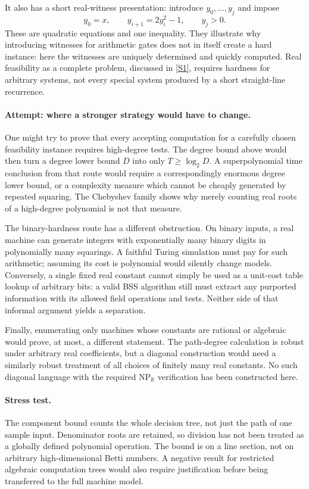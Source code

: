 \documentclass[11pt,a4paper]{article}
\newcommand{\R}{\mathbb{R}}
\newcommand{\sref}[2]{\hyperlink{source:#1:#2}{[S#2]}}
\numberwithin{equation}{section}
\begin{document}
It also has a short real-witness presentation: introduce $y_0,\ldots,y_j$
and impose
\[
 y_0=x,\qquad y_{i+1}=2y_i^2-1,\qquad y_j>0.
\]
These are quadratic equations and one inequality. They illustrate why
introducing witnesses for arithmetic gates does not in itself create a
hard instance: here the witnesses are uniquely determined and quickly
computed. Real feasibility as a complete problem, discussed in
\sref{30006767}{1}, requires hardness for arbitrary systems, not every special
system produced by a short straight-line recurrence.

\paragraph{Attempt: where a stronger strategy would have to change.}
One might try to prove that every accepting computation for a carefully
chosen feasibility instance requires high-degree tests. The degree bound
above would then turn a degree lower bound $D$ into only $T\ge\log_2D$.
A superpolynomial time conclusion from that route would require a
correspondingly enormous degree lower bound, or a complexity measure which
cannot be cheaply generated by repeated squaring. The Chebyshev family
shows why merely counting real roots of a high-degree polynomial is not
that measure.

The binary-hardness route has a different obstruction. On binary inputs,
a real machine can generate integers with exponentially many binary digits
in polynomially many squarings. A faithful Turing simulation must pay for
such arithmetic; assuming its cost is polynomial would silently change
models. Conversely, a single fixed real constant cannot simply be used as
a unit-cost table lookup of arbitrary bits: a valid BSS algorithm still
must extract any purported information with its allowed field operations
and tests. Neither side of that informal argument yields a separation.

Finally, enumerating only machines whose constants are rational or algebraic
would prove, at most, a different statement. The path-degree calculation
is robust under arbitrary real coefficients, but a diagonal construction
would need a similarly robust treatment of all choices of finitely many
real constants. No such diagonal language with the required
$\mathrm{NP}_{\R}$ verification has been constructed here.

\paragraph{Stress test.}
The component bound counts the whole decision tree, not just the path of
one sample input. Denominator roots are retained, so division has not been
treated as a globally defined polynomial operation. The bound is on a line
section, not on arbitrary high-dimensional Betti numbers. A negative result
for restricted algebraic computation trees would also require justification
before being transferred to the full machine model.
\end{document}
